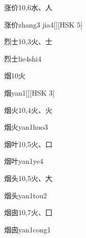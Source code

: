 \begin{entry}{涨价}{10,6}{⽔、⼈}
  \begin{phonetics}{涨价}{zhang3 jia4}[][HSK 5]
  \end{phonetics}
\end{entry}

\begin{entry}{烈士}{10,3}{⽕、⼠}
  \begin{phonetics}{烈士}{lie4shi4}
  \end{phonetics}
\end{entry}

\begin{entry}{烟}{10}{⽕}
  \begin{phonetics}{烟}{yan1}[][HSK 3]
  \end{phonetics}
\end{entry}

\begin{entry}{烟火}{10,4}{⽕、⽕}
  \begin{phonetics}{烟火}{yan1huo3}
  \end{phonetics}
\end{entry}

\begin{entry}{烟叶}{10,5}{⽕、⼝}
  \begin{phonetics}{烟叶}{yan1ye4}
  \end{phonetics}
\end{entry}

\begin{entry}{烟头}{10,5}{⽕、⼤}
  \begin{phonetics}{烟头}{yan1tou2}
  \end{phonetics}
\end{entry}

\begin{entry}{烟囱}{10,7}{⽕、⼞}
  \begin{phonetics}{烟囱}{yan1cong1}
  \end{phonetics}
\end{entry}

